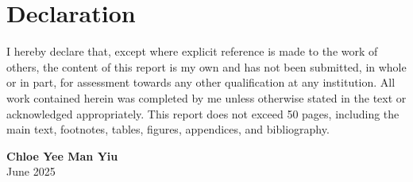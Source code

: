 \section*{\centering Declaration}
\vspace{1.5cm}
\begin{flushleft}
I hereby declare that, except where explicit reference is made to the work of others, the content of this report is my own and has not been submitted, in whole or in part, for assessment towards any other qualification at any institution. All work contained herein was completed by me unless otherwise stated in the text or acknowledged appropriately. This report does not exceed 50 pages, including the main text, footnotes, tables, figures, appendices, and bibliography.
\end{flushleft}

\vspace{1.5cm}
\begin{flushright}
    \textbf{Chloe Yee Man Yiu}\\
    June 2025
\end{flushright}
\clearpage
